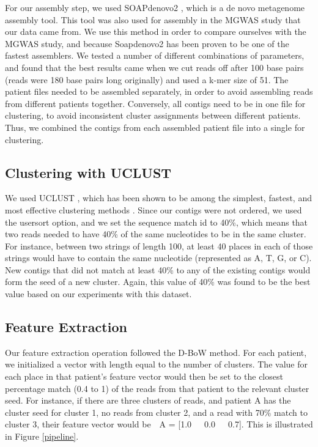 For our assembly step, we used SOAPdenovo2 \cite{luo12}, which is a de novo metagenome assembly tool. This tool was also used for assembly in the MGWAS study that our data came from. We use this method in order to compare ourselves with the MGWAS study, and because Soapdenovo2 has been proven to be one of the fastest assemblers\cite{peng12}. We tested a number of different combinations of parameters, and found that the best results came when we cut reads off after 100 base pairs (reads were 180 base pairs long originally) and used a k-mer size of 51. The patient files needed to be assembled separately, in order to avoid assembling reads from different patients together. Conversely, all contigs need to be in one file for clustering, to avoid inconsistent cluster assignments between different patients. Thus, we combined the contigs from each assembled patient file into a single for clustering.

\subsection{Clustering with UCLUST}

We used UCLUST \cite{Edgar10}, which has been shown to be among the simplest, fastest, and most effective clustering methods \cite{bonder090112, sun042711}. Since our contigs were not ordered, we used the usersort option, and we set the sequence match id to 40\%, which means that two reads needed to have 40\% of the same nucleotides to be in the same cluster. For instance, between two strings of length 100, at least 40 places in each of those strings would have to contain the same nucleotide (represented as A, T, G, or C). New contigs that did not match at least 40\% to any of the existing contigs would form the seed of a new cluster. Again, this value of 40\% was found to be the best value based on our experiments with this dataset.

\subsection{Feature Extraction}

Our feature extraction operation followed the D-BoW method. For each patient, we initialized a vector with length equal to the number of clusters. The value for each place in that patient's feature vector would then be set to the closest percentage match (0.4 to 1) of the reads from that patient to the relevant cluster seed. For instance, if there are three clusters of reads, and patient A has the cluster seed for cluster 1, no reads from cluster 2, and a read with 70\% match to cluster 3, their feature vector would be~~A = [1.0~~~0.0~~~0.7]. This is illustrated in Figure \ref{pipeline}.

